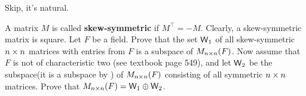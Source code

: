 \begin{exercise} \label{exercise 1.3.27}
Skip, it's natural.
\end{exercise}

\begin{exercise} \label{exercise 1.3.28}
A matrix \(M\) is called \textbf{skew-symmetric} if \(M^\top = -M\).
Clearly, a skew-symmetric matrix is square.
Let \(F\) be a field.
Prove that the set \(\textsf{W}_1\) of all skew-symmetric \(n \times n\) matrices with entries from \(F\) is a subspace of \(M_{n \times n}(F)\).
Now assume that \(F\) is not of characteristic two (see textbook page 549), and let \(\textsf{W}_2\) be the subspace(it is a subspace by ) of \(M_{n \times n}(F)\) consisting of all symmetric \(n \times n\) matrices.
Prove that \(M_{n \times n}(F) = \textsf{W}_1 \oplus \textsf{W}_2\).
\end{exercise}

